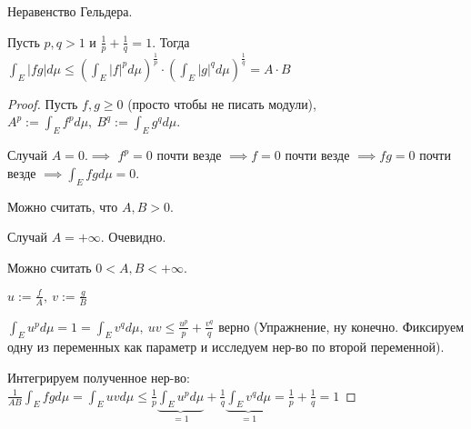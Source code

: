 \begin{properties}
    Неравенство Гельдера.

    Пусть $p, q > 1$ и $\frac{1}{p} + \frac{1}{q} = 1$. Тогда $\int_E |fg|d \mu \leq \left(\int_E |f|^p d \mu\right)^{\frac{1}{p}} \cdot \left(\int_E |g|^q d \mu\right)^{\frac{1}{q}} = A \cdot B$
\end{properties}
\begin{proof}
    Пусть $f, g \geq 0$ (просто чтобы не писать модули), $A^p := \int_E f^p d \mu, \ B^q := \int_E g^q d \mu$.

    Случай $A = 0. \implies$ $f^p = 0$ почти везде $\implies f = 0$ почти везде $\implies f g  = 0$ почти везде $\implies \int_E f g d \mu = 0$.

    Можно считать, что $A, B > 0$.

    Случай $A = +\infty$. Очевидно.

    Можно считать $0 < A , B < +\infty$.
    
    $u := \frac{f}{A}, \ v:= \frac{g}{B}$

    $\int_E u^p d \mu = 1 = \int_E v^q d \mu, \ uv \leq \frac{u^p}{p} + \frac{v^q}{q}$ верно (Упражнение, ну конечно. Фиксируем одну из переменных как параметр и исследуем нер-во по второй переменной).

    Интегрируем полученное нер-во: $\frac{1}{AB} \int_E f g d \mu = \int_E u v d \mu \leq \frac{1}{p} \underbrace{\int_E u^p d \mu}_{=1} + \frac{1}{q} \underbrace{\int_E v^q d \mu}_{=1} = \frac{1}{p} + \frac{1}{q} = 1$ 
\end{proof}

